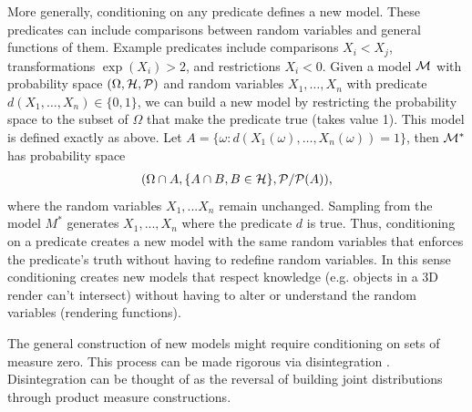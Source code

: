 More generally, conditioning on any predicate defines a new model. These
predicates can include comparisons between random variables and general 
functions of them. Example predicates include 
comparisons $X_i < X_j$, transformations $\exp(X_i) > 2$, and restrictions $X_i < 0$.
Given
a model ${\cal M}$  with probability space $(\Omega, {\cal H}, {\cal P})$ and
random variables $X_1,\dots, X_n$ with predicate $d(X_1, \dots, X_n) \in \{0, 1\}$,
we can build a new model by restricting the probability space to the subset of
$\Omega$ that make the predicate true (takes value 1). This model
is defined exactly as above.  Let $A = \{\omega : d(X_1(\omega), \dots, X_n(\omega)) = 1\}$,
then ${\cal M}^*$ has probability space
\begin{align*}
(\Omega \cap A, \{A \cap B, B \in {\cal H} \}, {\cal P} / {\cal P}(A)),
\end{align*}
where the random variables $X_1,...X_n$ remain unchanged. Sampling from
the model $M^*$ generates $X_1, ..., X_n$ where the predicate $d$ is true.
Thus, conditioning on a predicate creates a new model with the same 
random variables that enforces the predicate's truth 
without having to redefine random variables. In this sense conditioning
creates new models that respect knowledge (e.g. objects in a 3D render 
can't intersect) without having to alter or understand the random variables (rendering functions).

The general construction of new models might require conditioning
on sets of measure zero. This process can be made rigorous
via disintegration \citep{chang1997conditioning}. Disintegration can
be thought of as the reversal of building joint distributions through
product measure constructions.


